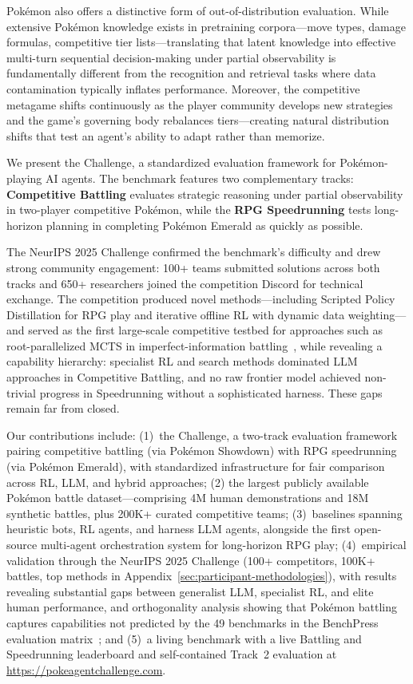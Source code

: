 Pokémon also offers a distinctive form of out-of-distribution evaluation. While extensive Pokémon knowledge exists in pretraining corpora---move types, damage formulas, competitive tier lists---translating that latent knowledge into effective multi-turn sequential decision-making under partial observability is fundamentally different from the recognition and retrieval tasks where data contamination typically inflates performance. Moreover, the competitive metagame shifts continuously as the player community develops new strategies and the game's governing body rebalances tiers---creating natural distribution shifts that test an agent's ability to adapt rather than memorize.

We present the \pokeagent Challenge, a standardized evaluation framework for Pokémon-playing AI agents. The benchmark features two complementary tracks: \textbf{Competitive Battling} evaluates strategic reasoning under partial observability in two-player competitive Pokémon, while the \textbf{RPG Speedrunning} tests long-horizon planning in completing Pokémon Emerald as quickly as possible.

The NeurIPS 2025 \pokeagent Challenge confirmed the benchmark's difficulty and drew strong community engagement: 100+ teams submitted solutions across both tracks and 650+ researchers joined the competition Discord for technical exchange. The competition produced novel methods---including Scripted Policy Distillation for RPG play and iterative offline RL with dynamic data weighting---and served as the first large-scale competitive testbed for approaches such as root-parallelized MCTS in imperfect-information battling~\citep{FoulPlay}, while revealing a capability hierarchy: specialist RL and search methods dominated LLM approaches in Competitive Battling, and no raw frontier model achieved non-trivial progress in Speedrunning without a sophisticated harness. These gaps remain far from closed.

Our contributions include: (1)~the \pokeagent Challenge, a two-track evaluation framework pairing competitive battling (via Pokémon Showdown) with RPG speedrunning (via Pokémon Emerald), with standardized infrastructure for fair comparison across RL, LLM, and hybrid approaches; (2) the largest publicly available Pokémon battle dataset---comprising 4M human demonstrations and 18M synthetic battles, plus 200K+ curated competitive teams; (3)~baselines spanning heuristic bots, RL agents, and harness LLM agents, alongside the first open-source multi-agent orchestration system for long-horizon RPG play; (4)~empirical validation through the NeurIPS 2025 \pokeagent Challenge (100+ competitors, 100K+ battles, top methods in Appendix~\ref{sec:participant-methodologies}), with results revealing substantial gaps between generalist LLM, specialist RL, and elite human performance, and orthogonality analysis showing that Pokémon battling captures capabilities not predicted by the 49 benchmarks in the BenchPress evaluation matrix~\citep{papailiopoulos2026benchpress}; and (5)~a living benchmark with a live Battling and Speedrunning leaderboard and self-contained Track~2 evaluation at \url{https://pokeagentchallenge.com}.